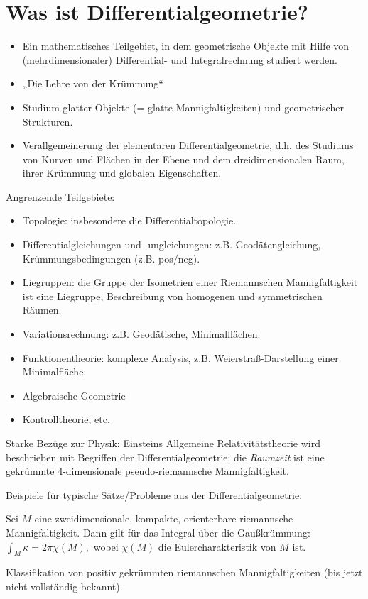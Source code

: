 
\section*{Was ist Differentialgeometrie?}

\begin{itemize}
    \item
        Ein mathematisches Teilgebiet, in dem geometrische Objekte mit Hilfe von (mehrdimensionaler) Differential- und Integralrechnung studiert werden.
    \item
        „Die Lehre von der Krümmung“
    \item
        Studium glatter Objekte (= glatte Mannigfaltigkeiten) und geometrischer Strukturen.
    \item
        Verallgemeinerung der elementaren Differentialgeometrie, d.h. des Studiums von Kurven und Flächen in der Ebene und dem dreidimensionalen Raum, ihrer Krümmung und globalen Eigenschaften.
\end{itemize}

Angrenzende Teilgebiete:
\begin{itemize}
    \item
        Topologie: insbesondere die Differentialtopologie.
    \item
        Differentialgleichungen und -ungleichungen: z.B. Geodätengleichung, Krümmungsbedingungen (z.B. pos/neg).
    \item
        Liegruppen: die Gruppe der Isometrien einer Riemannschen Mannigfaltigkeit ist eine Liegruppe, Beschreibung von homogenen und symmetrischen Räumen.
    \item
        Variationsrechnung: z.B. Geodätische, Minimalflächen.
    \item
        Funktionentheorie: komplexe Analysis, z.B. Weierstraß-Darstellung einer Minimalfläche.
    \item
        Algebraische Geometrie
    \item
        Kontrolltheorie, etc.
\end{itemize}

Starke Bezüge zur Physik:
Einsteins Allgemeine Relativitätstheorie wird beschrieben mit Begriffen der Differentialgeometrie: die \emph{Raumzeit} ist eine gekrümmte $4$-dimensionale pseudo-riemannsche Mannigfaltigkeit.

Beispiele für typische Sätze/Probleme aus der Differentialgeometrie:

\begin{st}
    Sei $M$ eine zweidimensionale, kompakte, orienterbare riemannsche Mannigfaltigkeit.
    Dann gilt für das Integral über die Gaußkrümmung:
    \begin{math}
        \int_M \kappa = 2 \pi \chi(M),
    \end{math}
    wobei $\chi(M)$ die Eulercharakteristik von $M$ ist.
\end{st}

\begin{prob}
    Klassifikation von positiv gekrümmten riemannschen Mannigfaltigkeiten (bis jetzt nicht vollständig bekannt).
\end{prob}




